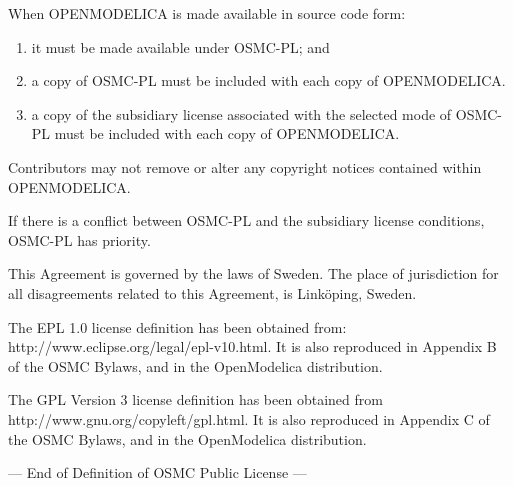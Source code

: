 \documentclass[a4paper, 12pt]{article}
\begin{document}
When OPENMODELICA is made available in source code form:

\begin{enumerate}[label=\alph*)]
\item it must be made available under OSMC-PL; and
\item a copy of OSMC-PL must be included with each copy of OPENMODELICA.
\item a copy of the subsidiary license associated with the selected mode of OSMC-PL must be included with each copy of OPENMODELICA.
\end{enumerate}

Contributors may not remove or alter any copyright notices contained within OPENMODELICA.
\vspace{0.5cm}

If there is a conflict between OSMC-PL and the subsidiary license conditions, OSMC-PL has priority.
\vspace{0.5cm}

This Agreement is governed by the laws of Sweden. The place of jurisdiction for all disagreements related to this Agreement, is Linköping, Sweden.
\vspace{0.5cm}

The EPL 1.0 license definition has been obtained from: http://www.eclipse.org/legal/epl-v10.html. It is also reproduced in Appendix B of the OSMC Bylaws, and in the OpenModelica distribution.
\vspace{0.5cm}

The GPL Version 3 license definition has been obtained from http://www.gnu.org/copyleft/gpl.html. It is also reproduced in Appendix C of the OSMC Bylaws, and in the OpenModelica distribution.

\vspace{0.5cm}

--- End of Definition of OSMC Public License ---
\end{document}
